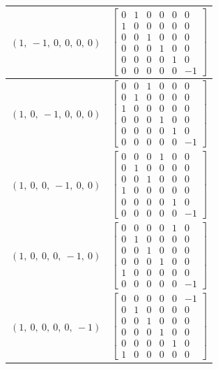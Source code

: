 \documentclass[11pt]{article}
\theoremstyle{definition}
\begin{document}
\begin{longtable}{|l|c|}
    \hline
    $\left( 1, \  -1, \  0, \  0, \  0, \  0\right)$ & ${\left[\begin{matrix}0 & 1 & 0 & 0 & 0 & 0\\1 & 0 & 0 & 0 & 0 & 0\\0 & 0 & 1 & 0 & 0 & 0\\0 & 0 & 0 & 1 & 0 & 0\\0 & 0 & 0 & 0 & 1 & 0\\0 & 0 & 0 & 0 & 0 & -1\end{matrix}\right]}$ \\
    \hline
    $\left( 1, \  0, \  -1, \  0, \  0, \  0\right)$ & ${\left[\begin{matrix}0 & 0 & 1 & 0 & 0 & 0\\0 & 1 & 0 & 0 & 0 & 0\\1 & 0 & 0 & 0 & 0 & 0\\0 & 0 & 0 & 1 & 0 & 0\\0 & 0 & 0 & 0 & 1 & 0\\0 & 0 & 0 & 0 & 0 & -1\end{matrix}\right]}$ \\
    \hline
    $\left( 1, \  0, \  0, \  -1, \  0, \  0\right)$ & ${\left[\begin{matrix}0 & 0 & 0 & 1 & 0 & 0\\0 & 1 & 0 & 0 & 0 & 0\\0 & 0 & 1 & 0 & 0 & 0\\1 & 0 & 0 & 0 & 0 & 0\\0 & 0 & 0 & 0 & 1 & 0\\0 & 0 & 0 & 0 & 0 & -1\end{matrix}\right]}$ \\
    \hline
    $\left( 1, \  0, \  0, \  0, \  -1, \  0\right)$ & ${\left[\begin{matrix}0 & 0 & 0 & 0 & 1 & 0\\0 & 1 & 0 & 0 & 0 & 0\\0 & 0 & 1 & 0 & 0 & 0\\0 & 0 & 0 & 1 & 0 & 0\\1 & 0 & 0 & 0 & 0 & 0\\0 & 0 & 0 & 0 & 0 & -1\end{matrix}\right]}$ \\
    \hline
    $\left( 1, \  0, \  0, \  0, \  0, \  -1\right)$ & ${\left[\begin{matrix}0 & 0 & 0 & 0 & 0 & -1\\0 & 1 & 0 & 0 & 0 & 0\\0 & 0 & 1 & 0 & 0 & 0\\0 & 0 & 0 & 1 & 0 & 0\\0 & 0 & 0 & 0 & 1 & 0\\1 & 0 & 0 & 0 & 0 & 0\end{matrix}\right]}$ \\
    \hline
\end{longtable}
\end{document}
